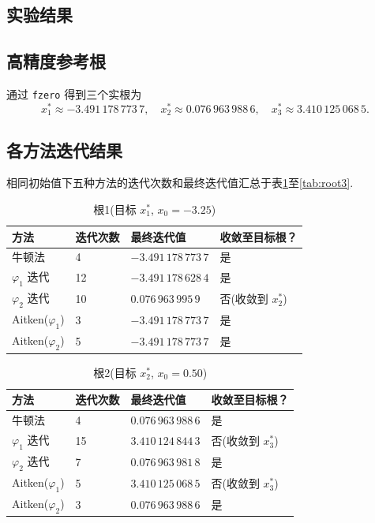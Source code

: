 \documentclass[12pt,a4paper]{ctexart}
\begin{document}
\subsection{实验结果}
\subsection*{高精度参考根}
通过 \texttt{fzero} 得到三个实根为
\[
x_1^* \approx -3.491\,178\,773\,7,\quad
x_2^* \approx 0.076\,963\,988\,6,\quad
x_3^* \approx 3.410\,125\,068\,5.
\]

\subsection*{各方法迭代结果}
相同初始值下五种方法的迭代次数和最终迭代值汇总于表\ref{tab:root1}至\ref{tab:root3}. 

\begin{table}[htbp]
    \centering
    \caption{根1(目标 $x_1^*$, $x_0=-3.25$)}
    \label{tab:root1}
    \begin{tabular}{@{}llll@{}}
        \toprule
        方法 & 迭代次数 & 最终迭代值 & 收敛至目标根？ \\
        \midrule
        牛顿法      & 4  & $-3.491\,178\,773\,7$ & 是 \\
        $\varphi_1$ 迭代 & 12 & $-3.491\,178\,628\,4$ & 是 \\
        $\varphi_2$ 迭代 & 10 & $0.076\,963\,995\,9$  & 否(收敛到 $x_2^*$) \\
        Aitken($\varphi_1$) & 3  & $-3.491\,178\,773\,7$ & 是 \\
        Aitken($\varphi_2$) & 5  & $-3.491\,178\,773\,7$ & 是 \\
        \bottomrule
    \end{tabular}
\end{table}

\begin{table}[htbp]
    \centering
    \caption{根2(目标 $x_2^*$, $x_0=0.50$)}
    \label{tab:root2}
    \begin{tabular}{@{}llll@{}}
        \toprule
        方法 & 迭代次数 & 最终迭代值 & 收敛至目标根？ \\
        \midrule
        牛顿法      & 4  & $0.076\,963\,988\,6$  & 是 \\
        $\varphi_1$ 迭代 & 15 & $3.410\,124\,844\,3$  & 否(收敛到 $x_3^*$) \\
        $\varphi_2$ 迭代 & 7  & $0.076\,963\,981\,8$  & 是 \\
        Aitken($\varphi_1$) & 5  & $3.410\,125\,068\,5$  & 否(收敛到 $x_3^*$) \\
        Aitken($\varphi_2$) & 3  & $0.076\,963\,988\,6$  & 是 \\
        \bottomrule
    \end{tabular}
\end{table}
\end{document}
